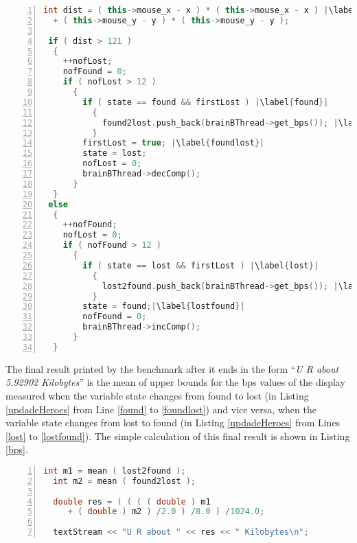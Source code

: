 \begin{lstlisting}[language={C++},numbers={left},stepnumber={1},numbersep={-1pt},basicstyle={\scriptsize\ttfamily},caption={The algorithm for administration of  losing and finding the character.},label={updadeHeroes},escapechar={|}]
 int dist = ( this->mouse_x - x ) * ( this->mouse_x - x ) |\label{dist}|
  + ( this->mouse_y - y ) * ( this->mouse_y - y );

 if ( dist > 121 ) 
  {
    ++nofLost;
    nofFound = 0;
    if ( nofLost > 12 ) 
      {
        if ( state == found && firstLost ) |\label{found}|
          {
            found2lost.push_back(brainBThread->get_bps()); |\label{save}|
          }
        firstLost = true; |\label{foundlost}|
        state = lost;
        nofLost = 0;
        brainBThread->decComp();
      }
  } 
 else 
  {
    ++nofFound;
    nofLost = 0;
    if ( nofFound > 12 ) 
      {
        if ( state == lost && firstLost ) |\label{lost}|
          {
            lost2found.push_back(brainBThread->get_bps()); |\label{save2}|
          }
        state = found;|\label{lostfound}|
        nofFound = 0;
        brainBThread->incComp();
      }
  }
\end{lstlisting}


The final result printed by the benchmark after it ends in the form \enquote{\textit{U R about 5.92902 Kilobytes}} is the mean of upper bounds for the bps values of the display measured when the variable state changes from found to lost (in Listing \ref{updadeHeroes} from Line \ref{found} to \ref{foundlost}) and vice versa, when the variable state changes from lost to found (in Listing \ref{updadeHeroes} from Lines \ref{lost} to \ref{lostfound}). The simple calculation of this final result is shown in Listing \ref{bps}.


\begin{lstlisting}[language={C++},numbers={left},stepnumber={1},numbersep={-1pt},basicstyle={\scriptsize\ttfamily},caption={The calculation of the final result of the benchmark that is produced in a text file that is saved in the folder where the benchmark was started.},label={bps},escapechar={|}]
  int m1 = mean ( lost2found );
  int m2 = mean ( found2lost );
  
  double res = ( ( ( ( double ) m1
     + ( double ) m2 ) /2.0 ) /8.0 ) /1024.0;
     
  textStream << "U R about " << res << " Kilobytes\n";
\end{lstlisting}


